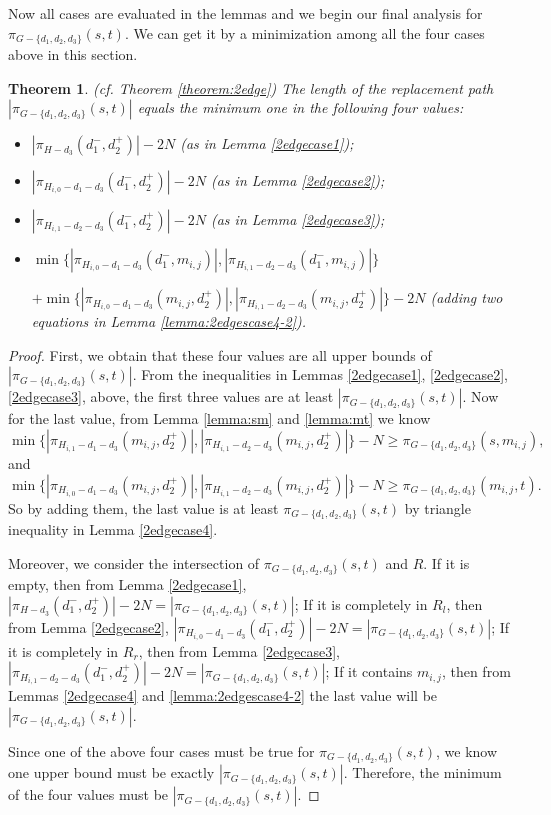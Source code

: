 \documentclass[11pt]{article}
\theoremstyle{plain}
\newtheorem{theorem}{Theorem}[section]
\theoremstyle{definition}
\newcommand{\set}[1]{\{ #1 \}}
\newcommand{\og}[3]{\pi_{G-#3}\left(#1,#2\right)}
\newcommand{\hg}[3]{\pi_{H-#3}\left(#1,#2\right)}
\begin{document}
Now all cases are evaluated in the lemmas and we begin our final analysis for $\og{s}{t}{\set{d_1, d_2, d_3}}$. We can get it by a minimization among all the four cases above in this section.

\begin{theorem}(cf. Theorem \ref{theorem:2edge})
The length of the replacement path $|\og{s}{t}{\set{d_1, d_2, d_3}}|$ equals the minimum one in the following four values:
\begin{itemize}
    \item $|\hg{d_1^-}{d_2^+}{d_3}|-2N$ (as in Lemma \ref{2edgecase1});
    \item $|\pi_{H_{i,0}-d_1-d_3}(d_1^-,d_2^+)|-2N$ (as in Lemma \ref{2edgecase2});
    \item $|\pi_{H_{i,1}-d_2-d_3}(d_1^-,d_2^+)|-2N$ (as in Lemma \ref{2edgecase3});
    \item $\min \{ |\pi_{H_{i,0}-d_1-d_3}(d_1^-,m_{i,j})|,|\pi_{H_{i,1}-d_2-d_3}(d_1^-,m_{i,j})| \}$ 
    
    $+ \min \{ |\pi_{H_{i,0}-d_1-d_3}(m_{i,j},d_2^+)|,|\pi_{H_{i,1}-d_2-d_3}(m_{i,j},d_2^+)| \} -2N$ (adding two equations in Lemma \ref{lemma:2edgescase4-2}).
\end{itemize}
\end{theorem}

\begin{proof}
    First, we obtain that these four values are all upper bounds of $|\og{s}{t}{\set{d_1, d_2, d_3}}|$. From the inequalities in Lemmas \ref{2edgecase1}, \ref{2edgecase2}, \ref{2edgecase3}, above, the first three values are at least $|\og{s}{t}{\set{d_1, d_2, d_3}}|$. Now for the last value, from Lemma \ref{lemma:sm} and \ref{lemma:mt} we know 
    $$\min \{ |\pi_{H_{i,1}-d_1-d_3}(m_{i,j},d_2^+)|, |\pi_{H_{i,1}-d_2-d_3}(m_{i,j},d_2^+)| \} - N \geq \og{s}{m_{i,j}}{\set{d_1, d_2, d_3}},$$ and $$\min \{ |\pi_{H_{i,0}-d_1-d_3}(m_{i,j},d_2^+)|, |\pi_{H_{i,1}-d_2-d_3}(m_{i,j},d_2^+)| \} - N \geq \og{m_{i,j}}{t}{\set{d_1, d_2, d_3}}.$$ So by adding them, the last value is at least $\og{s}{t}{\set{d_1, d_2, d_3}}$ by triangle inequality in Lemma \ref{2edgecase4}.
    
    Moreover, we consider the intersection of $\og{s}{t}{\set{d_1, d_2, d_3}}$ and $R$. 
    If it is empty, then from Lemma \ref{2edgecase1}, $|\hg{d_1^-}{d_2^+}{d_3}|-2N = |\og{s}{t}{\set{d_1, d_2, d_3}}|$; 
    If it is completely in $R_l$, then from Lemma \ref{2edgecase2}, $|\pi_{H_{i,0}-d_1-d_3}(d_1^-,d_2^+)|-2N = |\og{s}{t}{\set{d_1, d_2, d_3}}|$; 
    If it is completely in $R_r$, then from Lemma \ref{2edgecase3}, $|\pi_{H_{i,1}-d_2-d_3}(d_1^-,d_2^+)|-2N=|\og{s}{t}{\set{d_1, d_2, d_3}}|$; 
    If it contains $m_{i,j}$, then from Lemmas \ref{2edgecase4} and \ref{lemma:2edgescase4-2} the last value will be $|\og{s}{t}{\set{d_1, d_2, d_3}}|$. 
    
    Since one of the above four cases must be true for $\og{s}{t}{\set{d_1, d_2, d_3}}$, we know one upper bound must be exactly $|\og{s}{t}{\set{d_1, d_2, d_3}}|$. Therefore, the minimum of the four values must be $|\og{s}{t}{\set{d_1, d_2, d_3}}|$.
    
\end{proof}
\end{document}
